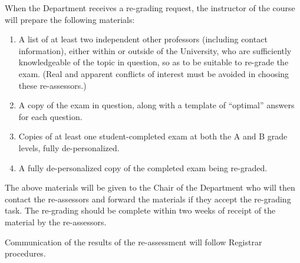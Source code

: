  When the Department receives a re-grading request, the instructor of
the course will prepare the following materials:

\begin{enumerate}

\item  A list of at least two independent other professors (including contact
information), either within or outside of the University, who are sufficiently
knowledgeable of the topic in question, so as to be suitable to re-grade the
exam.  (Real and apparent conflicts of interest must be avoided in choosing
these re-assessors.) 

\item A copy of the exam in question, along with a template of ``optimal''
    answers for each question.

\item Copies of at least one student-completed exam at both the A and B grade
levels, fully de-personalized.  

\item A fully de-personalized copy of the completed exam being re-graded.

\end{enumerate}

 The above materials will be given to the Chair of the Department who
will then contact the re-assessors and forward the materials if they accept the
re-grading task.  The re-grading should be complete within two weeks of receipt
of the material by the re-assessors.  

 Communication of the results of the re-assessment will follow
Registrar procedures.   



